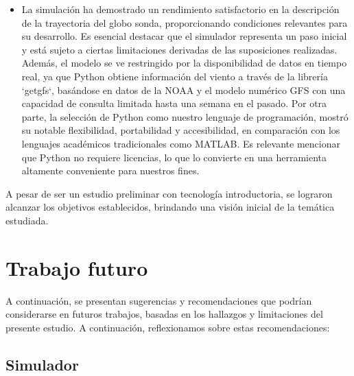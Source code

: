 \begin{itemize}
    \item  La simulación ha demostrado un rendimiento satisfactorio en la descripción de la trayectoria del globo sonda, proporcionando condiciones relevantes para su desarrollo. Es esencial destacar que el simulador representa un paso inicial y está sujeto a ciertas limitaciones derivadas de las suposiciones realizadas. Además, el modelo se ve restringido por la disponibilidad de datos en tiempo real, ya que Python obtiene información del viento a través de la librería `getgfs`, basándose en datos de la NOAA y el modelo numérico GFS con una capacidad de consulta limitada hasta una semana en el pasado. Por otra parte, la selección de Python como nuestro lenguaje de programación, mostró su notable flexibilidad, portabilidad y accesibilidad, en comparación con los lenguajes académicos tradicionales como MATLAB. Es relevante mencionar que Python no requiere licencias, lo que lo convierte en una herramienta altamente conveniente para nuestros fines.
\end{itemize}

A pesar de ser un estudio preliminar con tecnología introductoria, se lograron alcanzar los objetivos establecidos, brindando una visión inicial de la temática estudiada. 


\newpage


\section{Trabajo futuro} \label{sct:resultados_trabajofuturo}

A continuación, se presentan sugerencias y recomendaciones que podrían considerarse en futuros trabajos, basadas en los hallazgos y limitaciones del presente estudio. A continuación, reflexionamos sobre estas recomendaciones:

\subsection{Simulador}

